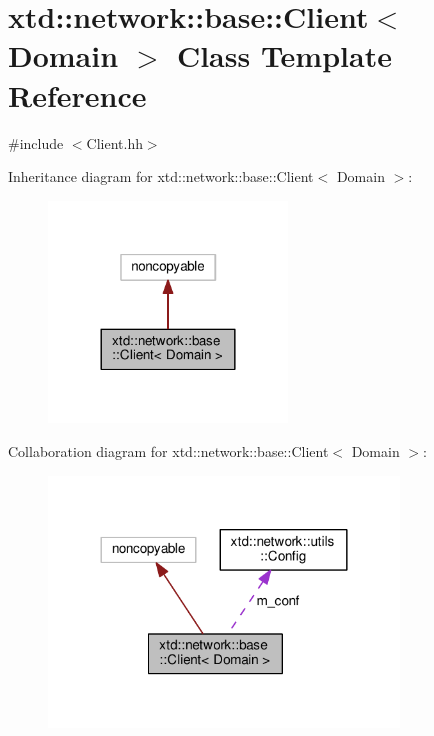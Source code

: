 \hypertarget{classxtd_1_1network_1_1base_1_1Client}{}\section{xtd\+:\+:network\+:\+:base\+:\+:Client$<$ Domain $>$ Class Template Reference}
\label{classxtd_1_1network_1_1base_1_1Client}


{\ttfamily \#include $<$Client.\+hh$>$}



Inheritance diagram for xtd\+:\+:network\+:\+:base\+:\+:Client$<$ Domain $>$\+:
\nopagebreak
\begin{figure}[H]
\begin{center}
\leavevmode
\includegraphics[width=180pt]{classxtd_1_1network_1_1base_1_1Client__inherit__graph}
\end{center}
\end{figure}


Collaboration diagram for xtd\+:\+:network\+:\+:base\+:\+:Client$<$ Domain $>$\+:
\nopagebreak
\begin{figure}[H]
\begin{center}
\leavevmode
\includegraphics[width=264pt]{classxtd_1_1network_1_1base_1_1Client__coll__graph}
\end{center}
\end{figure}
